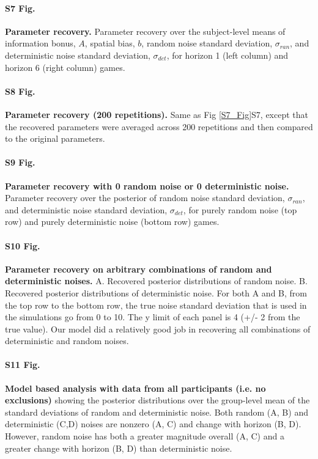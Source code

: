 \documentclass[12pt]{article}
\begin{document}
{\paragraph*{S7 Fig.}
\label{S7_Fig}
{\bf Parameter recovery.}
Parameter recovery over the subject-level means of information bonus, $A$, spatial bias, $b$, random noise standard deviation, $\sigma_{ran}$, and deterministic noise standard deviation, $\sigma_{det}$, for horizon 1 (left column) and horizon 6 (right column) games.

\paragraph*{S8 Fig.}
\label{S8_Fig}
{\bf Parameter recovery (200 repetitions).}
Same as Fig \ref{S7_Fig}{S7}, except that the recovered parameters were averaged across 200 repetitions and then compared to the original parameters.

\paragraph*{S9 Fig.}
\label{S9_Fig}
{\bf Parameter recovery with 0 random noise or 0 deterministic noise.} Parameter recovery over the posterior of random noise standard deviation, $\sigma_{ran}$, and deterministic noise standard deviation, $\sigma_{det}$, for purely random noise (top row) and purely deterministic noise (bottom row) games. 
	
\paragraph*{S10 Fig.}
\label{S10_Fig}
{\bf Parameter recovery on arbitrary combinations of random and deterministic noises.} A. Recovered posterior distributions of random noise. B. Recovered posterior distributions of deterministic noise. For both A and B, from the top row to the bottom row, the true noise standard deviation that is used in the simulations go from 0 to 10. The y limit of each panel is 4 (+/- 2 from the true value). Our model did a relatively good job in recovering all combinations of deterministic and random noises.

\paragraph*{S11 Fig.}
\label{S11_Fig}
{\bf Model based analysis with data from all participants (i.e. no exclusions)} showing the posterior distributions over the group-level mean of the standard deviations of  random and deterministic noise. Both random (A, B) and deterministic (C,D) noises are nonzero (A, C) and change with horizon (B, D).  However, random noise has both a greater magnitude overall (A, C) and a greater change with horizon (B, D) than deterministic noise.

}
\end{document}
